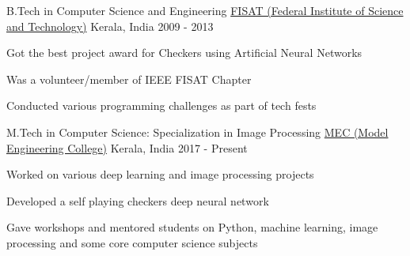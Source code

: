 \begin{cventries}
  \cventry
    {B.Tech in Computer Science and Engineering}
    {\href{http://fisat.ac.in/}{FISAT (Federal Institute of Science and Technology)}}
    {Kerala, India}
    {2009 - 2013}
    {
      \begin{cvitems}
        \item {Got the best project award for Checkers using Artificial Neural Networks}
        \item {Was a volunteer/member of IEEE FISAT Chapter}
        \item {Conducted various programming challenges as part of tech fests}
      \end{cvitems}
    }
  \cventry
    {M.Tech in Computer Science: Specialization in Image Processing}
    {\href{http://www.mec.ac.in/}{MEC (Model Engineering College)}}
    {Kerala, India}
    {2017 - Present}
    {
      \begin{cvitems}
        \item {Worked on various deep learning and image processing projects}
        \item {Developed a self playing checkers deep neural network}
        \item {Gave workshops and mentored students on Python, machine learning, image processing and some core computer science subjects}
      \end{cvitems}
    }
\end{cventries}
